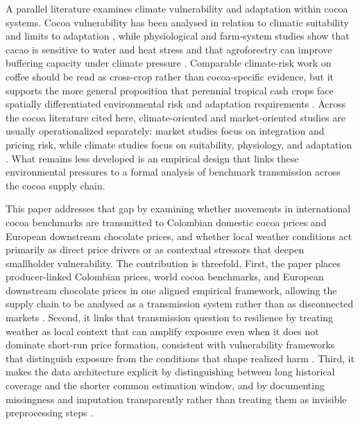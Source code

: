 \documentclass[11pt]{article}
\begin{document}
A parallel literature examines climate vulnerability and adaptation within cocoa systems. Cocoa vulnerability has been analysed in relation to climatic suitability and limits to adaptation \citep{Schroth2016,Laderach2013}, while physiological and farm-system studies show that cacao is sensitive to water and heat stress and that agroforestry can improve buffering capacity under climate pressure \citep{Lahive2019,Jacobi2013}. Comparable climate-risk work on coffee should be read as cross-crop rather than cocoa-specific evidence, but it supports the more general proposition that perennial tropical cash crops face spatially differentiated environmental risk and adaptation requirements \citep{Koh2020,Laderach2016}. Across the cocoa literature cited here, climate-oriented and market-oriented studies are usually operationalized separately: market studies focus on integration and pricing risk, while climate studies focus on suitability, physiology, and adaptation \citep{TsowouGayi2019,Poku2017,Schroth2016,Niether2020}. What remains less developed is an empirical design that links these environmental pressures to a formal analysis of benchmark transmission across the cocoa supply chain.

This paper addresses that gap by examining whether movements in international cocoa benchmarks are transmitted to Colombian domestic cocoa prices and European downstream chocolate prices, and whether local weather conditions act primarily as direct price drivers or as contextual stressors that deepen smallholder vulnerability. The contribution is threefold. First, the paper places producer-linked Colombian prices, world cocoa benchmarks, and European downstream chocolate prices in one aligned empirical framework, allowing the supply chain to be analysed as a transmission system rather than as disconnected markets \citep{acosta_ihle_voncramon_2019,JimenezRodriguez2022}. Second, it links that transmission question to resilience by treating weather as local context that can amplify exposure even when it does not dominate short-run price formation, consistent with vulnerability frameworks that distinguish exposure from the conditions that shape realized harm \citep{Turner2003,Adger2006}. Third, it makes the data architecture explicit by distinguishing between long historical coverage and the shorter common estimation window, and by documenting missingness and imputation transparently rather than treating them as invisible preprocessing steps \citep{troyanskaya_etal_2001,vanbuuren_groothuisoudshoorn_2011,hakkio_rush_1991}.
\end{document}
